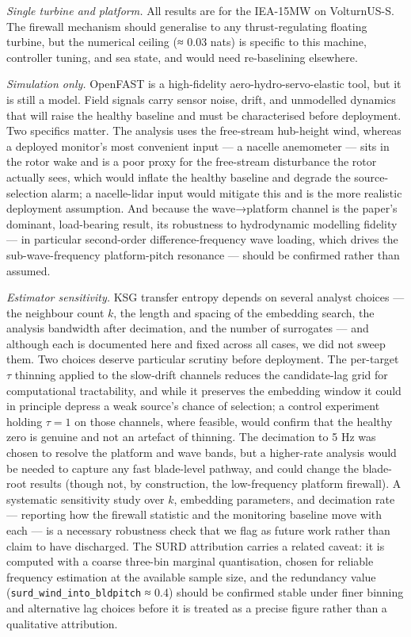 \documentclass[
  english,
  11pt,
]{article}
\begin{document}
\emph{Single turbine and platform.} All results are for the IEA-15MW on
VolturnUS-S. The firewall mechanism should generalise to any
thrust-regulating floating turbine, but the numerical ceiling (≈ 0.03
nats) is specific to this machine, controller tuning, and sea state, and
would need re-baselining elsewhere.

\emph{Simulation only.} OpenFAST is a high-fidelity
aero-hydro-servo-elastic tool, but it is still a model. Field signals
carry sensor noise, drift, and unmodelled dynamics that will raise the
healthy baseline and must be characterised before deployment. Two
specifics matter. The analysis uses the free-stream hub-height wind,
whereas a deployed monitor's most convenient input --- a nacelle
anemometer --- sits in the rotor wake and is a poor proxy for the
free-stream disturbance the rotor actually sees, which would inflate the
healthy baseline and degrade the source-selection alarm; a nacelle-lidar
input would mitigate this and is the more realistic deployment
assumption. And because the wave→platform channel is the paper's
dominant, load-bearing result, its robustness to hydrodynamic modelling
fidelity --- in particular second-order difference-frequency wave
loading, which drives the sub-wave-frequency platform-pitch resonance
--- should be confirmed rather than assumed.

\emph{Estimator sensitivity.} KSG transfer entropy depends on several
analyst choices --- the neighbour count \(k\), the length and spacing of
the embedding search, the analysis bandwidth after decimation, and the
number of surrogates --- and although each is documented here and fixed
across all cases, we did not sweep them. Two choices deserve particular
scrutiny before deployment. The per-target \(\tau\) thinning applied to
the slow-drift channels reduces the candidate-lag grid for computational
tractability, and while it preserves the embedding window it could in
principle depress a weak source's chance of selection; a control
experiment holding \(\tau = 1\) on those channels, where feasible, would
confirm that the healthy zero is genuine and not an artefact of
thinning. The decimation to 5 Hz was chosen to resolve the platform and
wave bands, but a higher-rate analysis would be needed to capture any
fast blade-level pathway, and could change the blade-root results
(though not, by construction, the low-frequency platform firewall). A
systematic sensitivity study over \(k\), embedding parameters, and
decimation rate --- reporting how the firewall statistic and the
monitoring baseline move with each --- is a necessary robustness check
that we flag as future work rather than claim to have discharged. The
SURD attribution carries a related caveat: it is computed with a coarse
three-bin marginal quantisation, chosen for reliable frequency
estimation at the available sample size, and the redundancy value
(\texttt{surd\_wind\_into\_bldpitch} ≈ 0.4) should be confirmed stable
under finer binning and alternative lag choices before it is treated as
a precise figure rather than a qualitative attribution.
\end{document}
